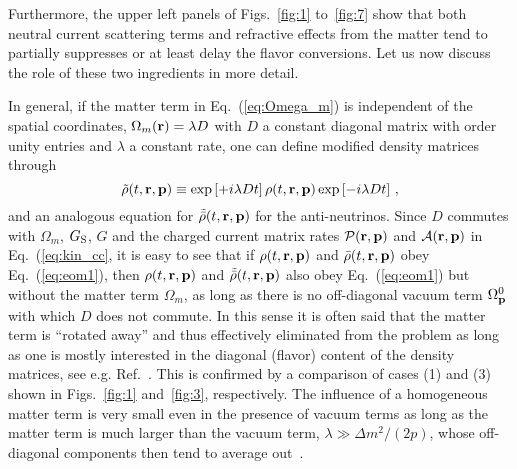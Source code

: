 \documentclass[prd,aps]{revtex4-2}
\begin{document}
Furthermore, the upper left panels of Figs.~\ref{fig:1} to~\ref{fig:7} show that
both neutral current scattering terms and refractive effects from the matter tend to partially suppresses or at least delay
the flavor conversions. Let us now discuss the role of these two ingredients in more detail.

In general, if the matter term in Eq.~(\ref{eq:Omega_m}) is independent of the spatial coordinates, $\Omega_m({\bf r})=\lambda D$
with $D$ a constant diagonal matrix with order unity entries and $\lambda$ a constant rate, one can define modified density matrices through
\begin{equation}
  \tilde\rho(t,{\bf r},{\bf p})\equiv\exp\left[+i\lambda Dt\right]\rho(t,{\bf r},{\bf p})\exp\left[-i\lambda Dt\right]\,,
\end{equation}
and an analogous equation for $\tilde{\bar\rho}(t,{\bf r},{\bf p})$ for the anti-neutrinos.
Since $D$ commutes with $\Omega_m$, $G_{\rm S}$, $G$ and the charged current matrix
rates ${\cal P}({\bf r},{\bf p})$ and ${\cal A}({\bf r},{\bf p})$ in Eq.~(\ref{eq:kin_cc}, it is easy to see that if
$\rho(t,{\bf r},{\bf p})$ and $\bar\rho(t,{\bf r},{\bf p})$ obey Eq.~(\ref{eq:eom1}), then $\rho(t,{\bf r},{\bf p})$ and
$\tilde{\bar\rho}(t,{\bf r},{\bf p})$ also obey Eq.~(\ref{eq:eom1}) but without the matter term $\Omega_m$, as long
as there is no off-diagonal vacuum term $\Omega^0_{\bf p}$ with which $D$ does not commute. In this
sense it is often said that the matter term is ``rotated away'' and thus effectively eliminated from the problem as long
as one is mostly interested in the diagonal (flavor) content of the density matrices, see e.g. Ref.~\cite{Chakraborty:2016yeg}.
This is confirmed by a comparison of cases (1) and (3) shown in Figs.~\ref{fig:1} and~\ref{fig:3}, respectively.
The influence of a homogeneous matter term is very small even in the presence of vacuum terms
as long as the matter term is much larger than the
vacuum term, $\lambda\gg\Delta m^2/(2p)$, whose off-diagonal components then tend to average out~\cite{Duan:2005cp}.
\end{document}
